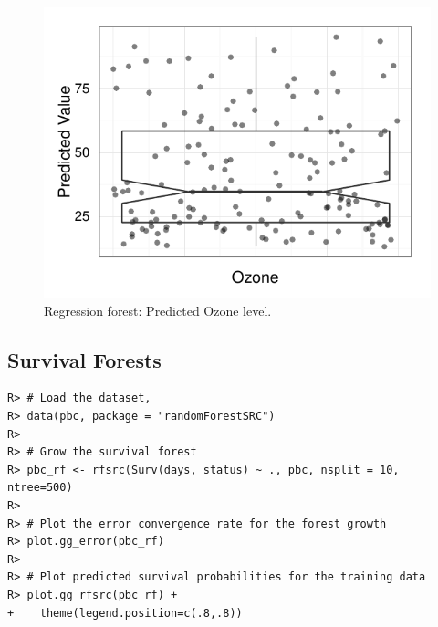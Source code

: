 \documentclass[nojss]{jss}\usepackage[]{graphicx}\usepackage[]{color}
\makeatletter
\def\maxwidth{ %
  \ifdim\Gin@nat@width>\linewidth
    \linewidth
  \else
    \Gin@nat@width
  \fi
}
\newenvironment{kframe}{%
 \def\at@end@of@kframe{}%
 \ifinner\ifhmode%
  \def\at@end@of@kframe{\end{minipage}}%
  \begin{minipage}{\columnwidth}%
 \fi\fi%
 \def\FrameCommand##1{\hskip\@totalleftmargin \hskip-\fboxsep
 \colorbox{shadecolor}{##1}\hskip-\fboxsep
     \hskip-\linewidth \hskip-\@totalleftmargin \hskip\columnwidth}%
 \MakeFramed {\advance\hsize-\width
   \@totalleftmargin\z@ \linewidth\hsize
   \@setminipage}}%
 {\par\unskip\endMakeFramed%
 \at@end@of@kframe}
\newenvironment{knitrout}{}{} %
\makeatother
\begin{document}
\begin{knitrout}\footnotesize
{}\color{fgcolor}\begin{figure}[!htpb]

{\centering \includegraphics[width=\maxwidth]{figure/vig-airq-rf-plot-1} 

}

\caption[Regression forest]{Regression forest: Predicted Ozone level.\label{fig:airq-rf-plot}}
\end{figure}


\end{knitrout}


\subsection{Survival Forests}
\begin{knitrout}\footnotesize
{}\color{fgcolor}\begin{kframe}
\begin{verbatim}
R> # Load the dataset,
R> data(pbc, package = "randomForestSRC")
R> 
R> # Grow the survival forest
R> pbc_rf <- rfsrc(Surv(days, status) ~ ., pbc, nsplit = 10, ntree=500)
R> 
R> # Plot the error convergence rate for the forest growth
R> plot.gg_error(pbc_rf)
R> 
R> # Plot predicted survival probabilities for the training data
R> plot.gg_rfsrc(pbc_rf) +
+    theme(legend.position=c(.8,.8))
\end{verbatim}
\end{kframe}
\end{knitrout}
\end{document}
